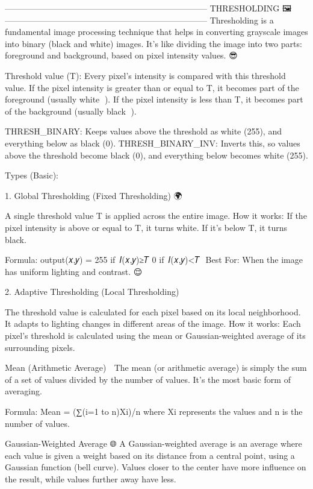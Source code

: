 ------------------------------------------------------------------------
THRESHOLDING 🖼️
------------------------------------------------------------------------
Thresholding is a fundamental image processing technique that helps in converting grayscale images into binary (black and white) images. It's like dividing the image into two parts: foreground and background, based on pixel intensity values. 😎

Threshold value (T): Every pixel's intensity is compared with this threshold value.
If the pixel intensity is greater than or equal to T, it becomes part of the foreground (usually white 🌟).
If the pixel intensity is less than T, it becomes part of the background (usually black 🖤).

THRESH_BINARY: Keeps values above the threshold as white (255), and everything below as black (0).
THRESH_BINARY_INV: Inverts this, so values above the threshold become black (0), and everything below becomes white (255).

Types (Basic):

1. Global Thresholding (Fixed Thresholding) 🌍

A single threshold value T is applied across the entire image.
How it works: If the pixel intensity is above or equal to T, it turns white. If it's below T, it turns black.

Formula:
output(𝑥,𝑦) = 255 if 𝐼(𝑥,𝑦)≥𝑇
              0  if 𝐼(𝑥,𝑦)<𝑇
​
Best For: When the image has uniform lighting and contrast. 😌

2. Adaptive Thresholding (Local Thresholding) 🌱

The threshold value is calculated for each pixel based on its local neighborhood. It adapts to lighting changes in different areas of the image.
How it works: Each pixel’s threshold is calculated using the mean or Gaussian-weighted average of its surrounding pixels.

Mean (Arithmetic Average) 🧮
The mean (or arithmetic average) is simply the sum of a set of values divided by the number of values. It's the most basic form of averaging.

Formula:
Mean = (∑(i=1 to n)Xi)/n
where Xi represents the values and n is the number of values.

Gaussian-Weighted Average 🌐
A Gaussian-weighted average is an average where each value is given a weight based on its distance from a central point, using a Gaussian function (bell curve). Values closer to the center have more influence on the result, while values further away have less.

